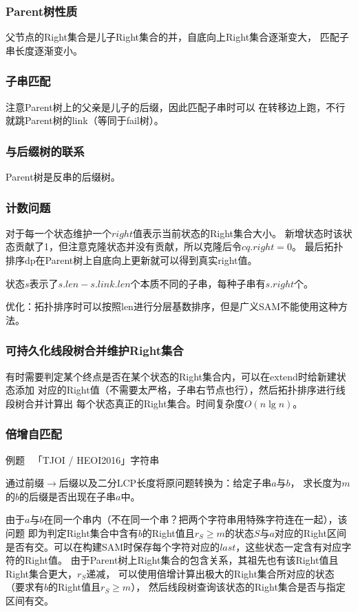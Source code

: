 \subsubsection{Parent树性质}
父节点的Right集合是儿子Right集合的并，自底向上Right集合逐渐变大，
匹配子串长度逐渐变小。
\subsubsection{子串匹配}
注意Parent树上的父亲是儿子的后缀，因此匹配子串时可以
在转移边上跑，不行就跳Parent树的link（等同于fail树）。
\subsubsection{与后缀树的联系}
Parent树是反串的后缀树。
\subsubsection{计数问题}
对于每一个状态维护一个$right$值表示当前状态的Right集合大小。
新增状态时该状态贡献了1，但注意克隆状态并没有贡献，所以克隆后令$cq.right=0$。
最后拓扑排序dp在Parent树上自底向上更新就可以得到真实right值。

状态$s$表示了$s.len-s.link.len$个本质不同的子串，每种子串有$s.right$个。

优化：拓扑排序时可以按照len进行分层基数排序，但是广义SAM不能使用这种方法。
\subsubsection{可持久化线段树合并维护Right集合}
有时需要判定某个终点是否在某个状态的Right集合内，可以在extend时给新建状态添加
对应的Right值（不需要太严格，子串右节点也行），然后拓扑排序进行线段树合并计算出
每个状态真正的Right集合。时间复杂度$O(n\lg n)$。
\subsubsection{倍增自匹配}
例题~ 「TJOI / HEOI2016」字符串

通过前缀$\rightarrow$后缀以及二分LCP长度将原问题转换为：给定子串$a$与$b$，
求长度为$m$的$b$的后缀是否出现在子串$a$中。

由于$a$与$b$在同一个串内（不在同一个串？把两个字符串用特殊字符连在一起），该问题
即为判定Right集合中含有$b$的Right值且$r_S\geq m$的状态$S$与$a$对应的Right区间
是否有交。可以在构建SAM时保存每个字符对应的$last$，这些状态一定含有对应字符的Right值。
由于Parent树上Right集合的包含关系，其祖先也有该Right值且Right集合更大，$r_S$递减，
可以使用倍增计算出极大的Right集合所对应的状态（要求有$b$的Right值且$r_S\geq m$），
然后线段树查询该状态的Right集合是否与指定区间有交。

